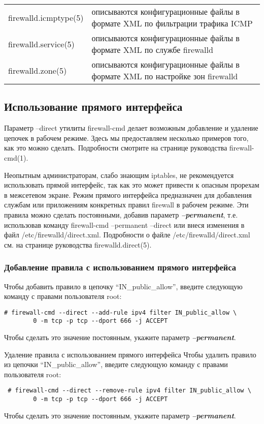 \documentclass[a4paper,10pt,twoside]{article}
\begin{document}
\begin{longtable}{  m{5cm}  m{10cm}  }  
firewalld.icmptype(5) & описываются конфигурационные файлы в формате XML по фильтрации трафика ICMP\\ 
firewalld.service(5) & описываются конфигурационные файлы в формате XML по службе firewalld\\
firewalld.zone(5) & описываются конфигурационные файлы в формате XML по настройке зон firewalld\\
\end{longtable}


\subsection{Использование прямого интерфейса}

Параметр --direct утилиты firewall-cmd делает возможным добавление и удаление цепочек в рабочем режиме. Здесь мы предоставляем несколько примеров того, как это можно сделать. Подробности смотрите на странице руководства firewall-cmd(1).

Неопытным администраторам, слабо знающим iptables, не рекомендуется использовать прямой интерфейс, так как это может привести к опасным прорехам в межсетевом экране. Режим прямого интерфейса предназначен для добавления службам или приложениям конкретных правил firewall в рабочем режиме. Эти правила можно сделать постоянными, добавив параметр \textit{\textbf{--permanent}}, т.е. использовав команду firewall-cmd --permanent --direct или внеся изменения в файл /etc/firewalld/direct.xml. Подробности о файле /etc/firewalld/direct.xml см. на странице руководства firewalld.direct(5).





\subsubsection{Добавление правила с использованием прямого интерфейса}
Чтобы добавить правило в цепочку “IN\_public\_allow”, введите следующую команду с правами пользователя root: 
\begin{verbatim}
# firewall-cmd --direct --add-rule ipv4 filter IN_public_allow \
        0 -m tcp -p tcp --dport 666 -j ACCEPT\end{verbatim} 
Чтобы сделать это значение постоянным, укажите параметр \textit{\textbf{--permanent}}. 

Удаление правила с использованием прямого интерфейса
Чтобы удалить правило из цепочки “IN\_public\_allow”, введите следующую команду с правами пользователя root: 
\begin{verbatim}
 # firewall-cmd --direct --remove-rule ipv4 filter IN_public_allow \
        0 -m tcp -p tcp --dport 666 -j ACCEPT
\end{verbatim} 
Чтобы сделать это значение постоянным, укажите параметр \textit{\textbf{--permanent}}.
\end{document}
